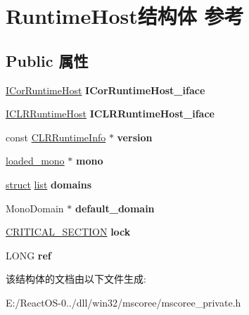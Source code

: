 \hypertarget{struct_runtime_host}{}\section{Runtime\+Host结构体 参考}
\label{struct_runtime_host}
\subsection*{Public 属性}
\begin{DoxyCompactItemize}
\item 
\mbox{\label{struct_runtime_host_a8f9aa8a3b68236e84d6f6081004d4e3b}} 
\hyperlink{interface_i_cor_runtime_host}{I\+Cor\+Runtime\+Host} {\bfseries I\+Cor\+Runtime\+Host\+\_\+iface}
\item 
\mbox{\label{struct_runtime_host_a218df9d1dad5bbe9e9afdfa0c01e11eb}} 
\hyperlink{interface_i_c_l_r_runtime_host}{I\+C\+L\+R\+Runtime\+Host} {\bfseries I\+C\+L\+R\+Runtime\+Host\+\_\+iface}
\item 
\mbox{\label{struct_runtime_host_a28fdda7213c355032d38784b65884c0e}} 
const \hyperlink{struct_c_l_r_runtime_info}{C\+L\+R\+Runtime\+Info} $\ast$ {\bfseries version}
\item 
\mbox{\label{struct_runtime_host_aca43b163eb966d058655f8e73facb946}} 
\hyperlink{structloaded__mono}{loaded\+\_\+mono} $\ast$ {\bfseries mono}
\item 
\mbox{\label{struct_runtime_host_aa9a78e81e0208793221b31f5761bcf35}} 
\hyperlink{interfacestruct}{struct} \hyperlink{classlist}{list} {\bfseries domains}
\item 
\mbox{\label{struct_runtime_host_a962ebdb0afe7090d61d2dadf947f9018}} 
Mono\+Domain $\ast$ {\bfseries default\+\_\+domain}
\item 
\mbox{\label{struct_runtime_host_a89bb925971cd413402681d88a2d8206d}} 
\hyperlink{struct___c_r_i_t_i_c_a_l___s_e_c_t_i_o_n}{C\+R\+I\+T\+I\+C\+A\+L\+\_\+\+S\+E\+C\+T\+I\+ON} {\bfseries lock}
\item 
\mbox{\label{struct_runtime_host_ab7c5f2372a2ca93381d79dcdfa868cc3}} 
L\+O\+NG {\bfseries ref}
\end{DoxyCompactItemize}


该结构体的文档由以下文件生成\+:\begin{DoxyCompactItemize}
\item 
E\+:/\+React\+O\+S-\/0../dll/win32/mscoree/mscoree\+\_\+private.\+h\end{DoxyCompactItemize}
